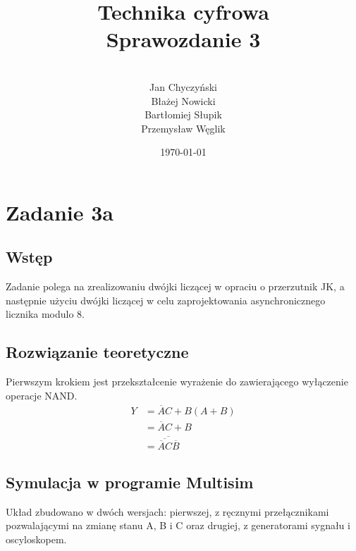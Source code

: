 \documentclass[12pt,a4paper,openright]{mwrep}
\begin{document}
\title{%
Technika cyfrowa\\
Sprawozdanie 3\\
}

\author{\\Jan Chyczyński\\Błażej Nowicki
\\Bartłomiej Słupik\\Przemysław Węglik}

\date{\today}

\maketitle
\tableofcontents

\chapter{Zadanie 3a}

\section{Wstęp}
Zadanie polega na zrealizowaniu dwójki liczącej w opraciu o 
przerzutnik JK, a następnie użyciu dwójki liczącej w celu zaprojektowania
asynchronicznego licznika modulo 8.

\section{Rozwiązanie teoretyczne}
Pierwszym krokiem jest przekształcenie wyrażenie do zawierającego
wyłączenie operacje NAND.
\begin{align*}
    Y &= \overline{A}C + B(A + B) \\
    &= \overline{A}C + B \\
    &= \overline{\overline{\overline{A}C}\overline{B}}
\end{align*}

\section{Symulacja w programie Multisim}
Układ zbudowano w dwóch wersjach: pierwszej, z ręcznymi przełącznikami 
pozwalającymi na zmianę stanu A, B i C oraz drugiej, z generatorami sygnału
i oscyloskopem.

\end{document}
